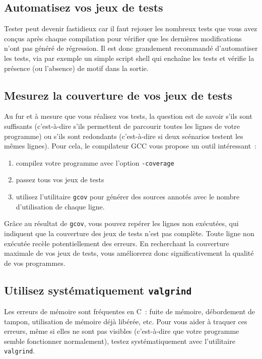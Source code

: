 \documentclass {article}
\begin{document}
\subsection {Automatisez vos jeux de tests}

Tester peut devenir fastidieux car il faut rejouer les nombreux tests
que vous avez conçus après chaque compilation pour vérifier que les
dernières modifications n'ont pas généré de régression. Il est
donc grandement recommandé d'automatiser les tests, via par exemple
un simple script shell qui enchaîne les tests et vérifie la présence
(ou l'absence) de motif dans la sortie.


\subsection {Mesurez la couverture de vos jeux de tests}

Au fur et à mesure que vous réalisez vos tests, la question est
de savoir s'ils sont suffisants (c'est-à-dire s'ils permettent de
parcourir toutes les lignes de votre programme) ou s'ils sont redondants
(c'est-à-dire si deux scénarios testent les mêmes lignes). Pour cela,
le compilateur GCC vous propose un outil intéressant~:

\begin {enumerate}
    \item compilez votre programme avec l'option \texttt {-coverage}
    \item passez tous vos jeux de tests
    \item utilisez l'utilitaire \texttt {gcov} pour générer des sources
	annotés avec le nombre d'utilisation de chaque ligne.

\end {enumerate}

Grâce au résultat de \texttt {gcov}, vous pouvez repérer les lignes
non exécutées, qui indiquent que la couverture des jeux de tests n'est
pas complète. Toute ligne non exécutée recèle potentiellement des
erreurs.  En recherchant la couverture maximale de vos jeux de tests,
vous améliorerez donc significativement la qualité de vos programmes.


\subsection {Utilisez systématiquement \texttt {valgrind}}

Les erreurs de mémoire sont fréquentes en C~: fuite de mémoire,
débordement de tampon, utilisation de mémoire déjà libérée,
etc. Pour vous aider à traquer ces erreurs, même si elles ne sont
pas visibles (c'est-à-dire que votre programme semble fonctionner
normalement), testez systématiquement avec l'utilitaire \texttt
{valgrind}.
\end{document}
